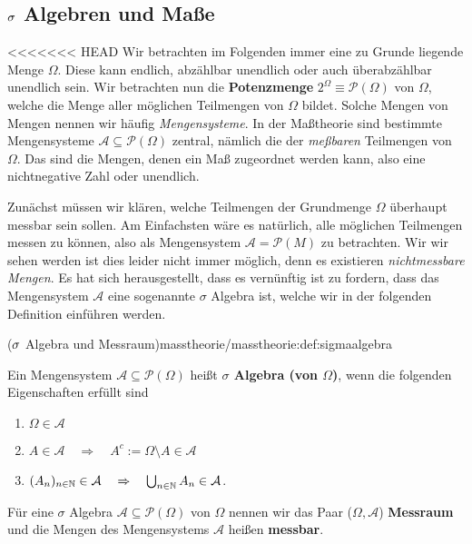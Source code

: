 \subsection{\protect\(\sigma\protect\) Algebren und Maße}
\label{\detokenize{masstheorie/masstheorie:sigma-algebren-und-masze}}
\par
<<<<<<< HEAD
Wir betrachten im Folgenden immer eine zu Grunde liegende Menge \(\Omega\).
Diese kann endlich, abzählbar unendlich oder auch überabzählbar unendlich sein.
Wir betrachten nun die \textbf{Potenzmenge} \(2^\Omega \equiv\mathcal{P}(\Omega)\) von \(\Omega\), welche die Menge aller möglichen Teilmengen von \(\Omega\) bildet.
Solche Mengen von Mengen nennen wir häufig \emph{Mengensysteme}.
In der Maßtheorie sind bestimmte Mengensysteme \(\mathcal{A} \subseteq \mathcal{P}(\Omega)\) zentral, nämlich die der \emph{meßbaren} Teilmengen von \(\Omega\).
Das sind die Mengen, denen ein Maß zugeordnet werden kann, also eine nichtnegative Zahl oder unendlich.

\par
Zunächst müssen wir klären, welche Teilmengen der Grundmenge \(\Omega\) überhaupt messbar sein sollen.
Am Einfachsten wäre es natürlich, alle möglichen Teilmengen messen zu können, also als Mengensystem \(\mathcal{A} = \mathcal{P}(M)\) zu betrachten.
Wir wir sehen werden ist dies leider nicht immer möglich, denn es existieren \emph{nichtmessbare Mengen}.
Es hat sich herausgestellt, dass es vernünftig ist zu fordern, dass das Mengensystem \(\mathcal{A}\) eine sogenannte \(\sigma\) Algebra ist, welche wir in der folgenden Definition einführen werden.
\begin{definition}{(\protect\(\sigma\protect\) Algebra und Messraum)}{masstheorie/masstheorie:def:sigmaalgebra}



\par
Ein Mengensystem \(\mathcal{A} \subseteq \mathcal{P}(\Omega)\) heißt \textbf{\(\sigma\) Algebra (von \(\Omega\))}, wenn die folgenden Eigenschaften erfüllt sind
\begin{enumerate}

\item {} 
\par
\(\Omega\in \mathcal{A}\)

\item {} 
\par
\(A\in \mathcal{A} \quad \Rightarrow \quad A^c:=\Omega \setminus A\in \mathcal{A}\)

\item {} 
\par
\((A_n)_{n\in\mathbb{N}} \in \mathcal{A} \quad \Rightarrow \quad \bigcup_{n\in \mathbb{N}} A_n\in \mathcal{A}\).

\end{enumerate}

\par
Für eine \(\sigma\) Algebra \(\mathcal{A} \subseteq \mathcal{P}(\Omega)\) von \(\Omega\) nennen wir das Paar (\(\Omega,\mathcal{A}\)) \textbf{Messraum} und die Mengen des Mengensystems \(\mathcal{A}\) heißen \textbf{messbar}.
\end{definition}

